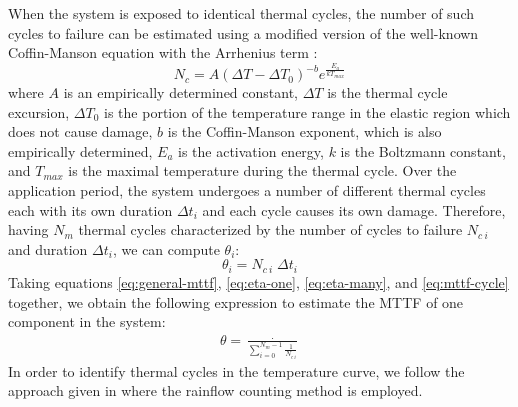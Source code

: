 When the system is exposed to identical thermal cycles, the number of such cycles to failure can be estimated using a modified version of the well-known Coffin-Manson equation with the Arrhenius term \cite{xiang2010, jedec2010}:
\[
  N_c = A (\Delta T - \Delta T_0)^{-b} e^{\frac{E_a}{k T_{max}}}
\]
where $A$ is an empirically determined constant, $\Delta T$ is the thermal cycle excursion, $\Delta T_0$ is the portion of the temperature range in the elastic region which does not cause damage, $b$ is the Coffin-Manson exponent, which is also empirically determined, $E_{a}$ is the activation energy, $k$ is the Boltzmann constant, and $T_{max}$ is the maximal temperature during the thermal cycle. Over the application period, the system undergoes a number of different thermal cycles each with its own duration $\Delta t_i$ and each cycle causes its own damage. Therefore, having $N_m$ thermal cycles characterized by the number of cycles to failure $N_{c\:i}$ and duration $\Delta t_i$, we can compute $\theta_i$:
\begin{equation} \label{eq:mttf-cycle}
  \theta_i = N_{c \: i} \; \Delta t_i
\end{equation}
Taking equations \eqref{eq:general-mttf}, \eqref{eq:eta-one}, \eqref{eq:eta-many}, and \eqref{eq:mttf-cycle} together, we obtain the following expression to estimate the MTTF of one component in the system:
\begin{align}
  \theta = \frac{\period}{\sum_{i=0}^{N_m - 1} \frac{1}{N_{c \: i}}}
\end{align}
In order to identify thermal cycles in the temperature curve, we follow the approach given in \cite{xiang2010} where the rainflow counting method is employed.
